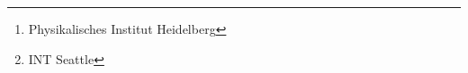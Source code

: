 \author{Sebastian Neubert\footnote{Physikalisches Institut Heidelberg}, Martin Hoferichter\footnote{INT Seattle}, Miriam Fritsch$^c$, Simon Eidelman$^{d,e}$, Michael Pennington$^f$, Bernhard Ketzer$^g$, Jonas Rademacker$^h$, Wolfgang Gradl$^j$, Christoph Hanhart$^k$, Bastian Kubis$^l$, José R. Peláez$^m$, Claudia Patrignani$n$}


